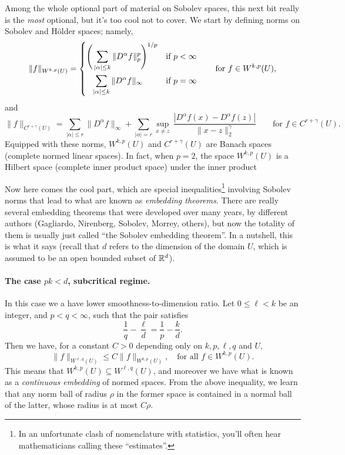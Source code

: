 \documentclass{article}
\begin{document}
Among the whole optional part of material on Sobolev spaces, this next bit   
really is the \emph{most} optional, but it's too cool not to cover. We start by
defining norms on Sobolev and H{\"o}lder spaces; namely,
\[
\|f\|_{W^{k,p}(U)} = 
\begin{dcases} 
\Bigg( \sum_{|\alpha| \leq k} \|D^\alpha f\|_p^p \Bigg)^{1/p} & \text{if $p <
  \infty$} \\
\;\;\; \sum_{|\alpha| \leq k} \|D^\alpha f\|_\infty & \text{if $p = \infty$}   
\end{dcases}
\qquad \text{for $f \in W^{k,p}(U)$},
\]
and 
\[
\|f\|_{C^{r+\gamma}(U)} = \sum_{|\alpha| \leq r} \|D^\alpha f\|_\infty +
\sum_{|\alpha| = r} \sup_{x \not= z} \, \frac{|D^\alpha f(x) - D^\alpha f(z)|} 
{\|x-z\|_2^\gamma}
\qquad \text{for $f \in C^{r+\gamma}(U)$}. 
\] 
Equipped with these norms, $W^{k,p}(U)$ and $C^{r+\gamma}(U)$ are Banach 
spaces (complete normed linear spaces). In fact, when $p=2$, the space
$W^{k,p}(U)$ is a Hilbert space (complete inner product space) under the inner
product 

Now here comes the cool part, which are special inequalities\footnote{In an
  unfortunate clash of nomenclature with statistics, you'll often hear
  mathematicians calling these ``estimates''.} involving Sobolev norms that lead 
to what are known as \emph{embedding theorems}. There are really several
embedding theorems that were developed over many years, by different authors
(Gagliardo, Nirenberg, Sobolev, Morrey, others), but now the totality of them is
usually just called ``the Sobolev embedding theorem''. In a nutshell, this is
what it says (recall that $d$ refers to the dimension of the domain $U$, which
is assumed to be an open bounded subset of $\mathbb{R}^d$). 

\paragraph{The case $pk < d$, subcritical regime.}

In this case we a have lower smoothness-to-dimension ratio. Let $0 \leq \ell <
k$ be an integer, and $p < q < \infty$, such that the pair satisfies   
\[
\frac{1}{q} - \frac{\ell}{d} = \frac{1}{p} - \frac{k}{d}.
\]
Then we have, for a constant $C>0$ depending only on $k,p,\ell,q$ and $U$, 
\[
\|f\|_{W^{\ell,q}(U)} \leq C \|f\|_{W^{k,p}(U)}, \quad \text{for all $f \in
  W^{k,p}(U)$}.
\]
This means that $W^{k,p}(U) \subseteq W^{\ell,q}(U)$, and moreover we have what 
is known as a \emph{continuous embedding} of normed spaces. From the above    
inequality, we learn that any norm ball of radius $\rho$ in the former space
is contained in a normal ball of the latter, whose radius is at most $C\rho$.
\end{document}
